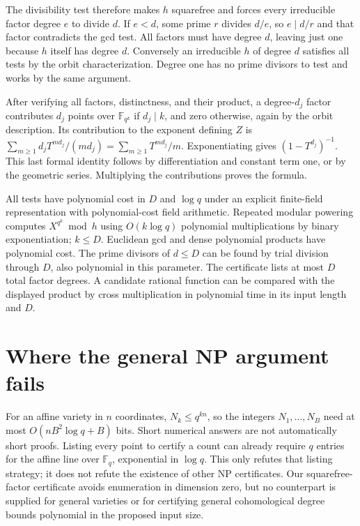 \documentclass[11pt]{article}
\begin{document}
The divisibility test therefore makes $h$ squarefree and forces every
irreducible factor degree $e$ to divide $d$. If $e<d$, some prime
$r$ divides $d/e$, so $e\mid d/r$ and that factor contradicts the
gcd test. All factors must have degree $d$, leaving just one because
$h$ itself has degree $d$. Conversely an irreducible $h$ of degree
$d$ satisfies all tests by the orbit characterization. Degree one
has no prime divisors to test and works by the same argument.

After verifying all factors, distinctness, and their product, a
degree-$d_j$ factor contributes $d_j$ points over $\mathbb F_{q^k}$
if $d_j\mid k$, and zero otherwise, again by the orbit description.
Its contribution to the exponent defining $Z$ is
$\sum_{m\ge1}d_jT^{md_j}/(md_j)=\sum_{m\ge1}T^{md_j}/m$.
Exponentiating gives $(1-T^{d_j})^{-1}$. This last formal identity
follows by differentiation and constant term one, or by the geometric
series. Multiplying the contributions proves the formula.

All tests have polynomial cost in $D$ and $\log q$ under an explicit
finite-field representation with polynomial-cost field arithmetic.
Repeated modular powering computes $X^{q^k}\bmod h$ using
$O(k\log q)$ polynomial multiplications by binary exponentiation;
$k\le D$. Euclidean gcd and dense polynomial products have polynomial
cost. The prime divisors of $d\le D$ can be found by trial division
through $D$, also polynomial in this parameter. The certificate lists
at most $D$ total factor degrees. A candidate rational function can
be compared with the displayed product by cross multiplication in
polynomial time in its input length and $D$.

\section{Where the general NP argument fails}
For an affine variety in $n$ coordinates, $N_k\le q^{kn}$, so
the integers $N_1,\ldots,N_B$ need at most
$O(nB^2\log q+B)$ bits. Short numerical answers are not automatically
short proofs. Listing every point to certify a count can already
require $q$ entries for the affine line over $\mathbb F_q$, exponential
in $\log q$. This only refutes that listing strategy; it does not
refute the existence of other NP certificates. Our squarefree-factor
certificate avoids enumeration in dimension zero, but no counterpart
is supplied for general varieties or for certifying general cohomological
degree bounds polynomial in the proposed input size.
\end{document}
